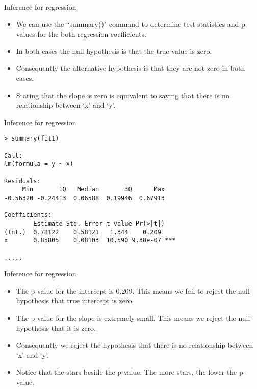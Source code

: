 \documentclass[pdf,default,slideColor,colorBG]{prosper}
\begin{document}

\begin{slide}{Inference for regression}
\begin{itemize}
\item
We can use the ``summary()" command to determine
test statistics and p-values for the both
regression coefficients.
\item In both cases the null hypothesis is that the true value is zero.
\item Consequently the alternative hypothesis is that they are not zero in both cases.
\item Stating that the slope is zero is equivalent to saying that there is no relationship between `x' and `y'.
\end{itemize}
\end{slide}

\begin{slide}{Inference for regression}
\begin{verbatim}
> summary(fit1)

Call:
lm(formula = y ~ x)

Residuals:
     Min       1Q   Median       3Q      Max
-0.56320 -0.24413  0.06588  0.19946  0.67913

Coefficients:
        Estimate Std. Error t value Pr(>|t|)
(Int.)  0.78122    0.58121   1.344    0.209
x       0.85805    0.08103  10.590 9.38e-07 ***

.....

\end{verbatim}
\end{slide}

\begin{slide}{Inference for regression}
\begin{itemize}
\item The p value for the intercept is 0.209. This means we fail to reject the null hypothesis that true intercept is zero.
\item The p value for the slope is extremely small. This means we reject the null hypothesis that it is zero.
\item Consequently we reject the hypothesis that there is no relationship between `x' and `y'.
\item Notice that the stars beside the p-value. The more stars, the lower the p-value.
\end{itemize}
\end{slide}
\end{document}
